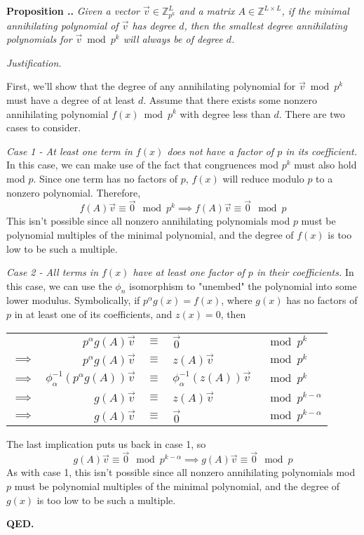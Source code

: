 \documentclass[a4paper, reqno, 12pt]{amsart}
\newcounter{propcounter}[section]
\newenvironment{proposition}[1]
{
	\refstepcounter{propcounter}
	\textbf{Proposition \thesection.\thepropcounter.} \emph{#1}
	
	\emph{Justification.}
}
{
	\textbf{QED.} \\
}
\begin{document}
		\begin{proposition}{Given a vector $\vec{v} \in \mathds{Z}_{p^k}^{L}$ and a matrix $A \in \mathds{Z}^{L \times L}$, if the minimal annihilating polynomial of 
		$\vec{v}$ has degree $d$, then the smallest degree annihilating polynomials for $\vec{v} \bmod{p^k}$ will always be of degree $d$.}
			\label{prop:smallestAnnihDegree}
			First, we'll show that the degree of any annihilating polynomial for $\vec{v} \bmod{p^k}$ must have a degree of at least $d$. Assume that there exists some 
			nonzero annihilating polynomial $f(x) \bmod{p^k}$ with degree less than $d$. There are two cases to consider.
			
			\emph{Case 1 - At least one term in $f(x)$ does not have a factor of $p$ in its coefficient.} In this case, we can make use of the fact that congruences mod 
			$p^k$ must also hold mod $p$. Since one term has no factors of $p$, $f(x)$ will reduce modulo $p$ to a 
			nonzero polynomial. Therefore,
			\[
				f(A)\vec{v} \equiv \vec{0} \mod{p^k} \implies f(A)\vec{v} \equiv \vec{0} \mod{p}
			\]
			This isn't possible since all nonzero annihilating polynomials mod $p$ must be polynomial multiples of the minimal polynomial, and the degree of $f(x)$ is too 
			low to be such a multiple.
			
			\emph{Case 2 - All terms in $f(x)$ have at least one factor of $p$ in their coefficients.} In this case, we can use the $\phi_n$ isomorphism to "unembed" the 
			polynomial into some lower modulus. Symbolically, if $p^\alpha g(x) = f(x)$, where $g(x)$ has no factors of $p$ in at least one of its coefficients, and 
			$z(x) = 0$, then
			\begin{center}
				\begin{tabular}{crcll}
							   &                     $p^\alpha g(A)\vec{v}$ & $\equiv$ & $\vec{0}$                         & $\mod{p^k}$            \\
					$\implies$ &                     $p^\alpha g(A)\vec{v}$ & $\equiv$ & $z(A)\vec{v}$                     & $\mod{p^k}$            \\
					$\implies$ & $\phi_{\alpha}^{-1}(p^\alpha g(A))\vec{v}$ & $\equiv$ & $\phi_{\alpha}^{-1}(z(A))\vec{v}$ & $\mod{p^k}$            \\
					$\implies$ &                              $g(A)\vec{v}$ & $\equiv$ & $z(A)\vec{v}$                     & $\mod{p^{k - \alpha}}$ \\
					$\implies$ &                              $g(A)\vec{v}$ & $\equiv$ & $\vec{0}$                         & $\mod{p^{k - \alpha}}$
				\end{tabular}
			\end{center}
			The last implication puts us back in case 1, so
			\[
				g(A)\vec{v} \equiv \vec{0} \mod{p^{k - \alpha}} \implies g(A)\vec{v} \equiv \vec{0} \mod{p}
			\]
			As with case 1, this isn't possible since all nonzero annihilating polynomials mod $p$ must be polynomial multiples of the minimal polynomial, and the degree 
			of $g(x)$ is too low to be such a multiple.
			

\end{proposition}
\end{document}
